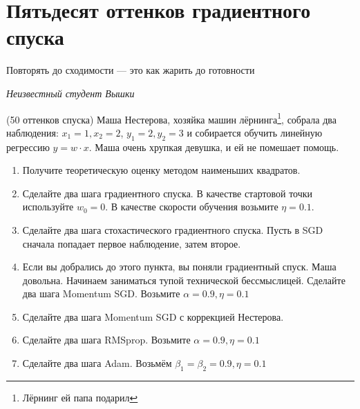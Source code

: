 
\section{Пятьдесят оттенков градиентного спуска}

\epigraph{Повторять до сходимости --- это как жарить до готовности}{\textit{Неизвестный студент Вышки}}



\begin{problem}{(50 оттенков спуска)}
	Маша Нестерова, хозяйка машин лёрнинга\footnote{Лёрнинг ей папа подарил},  собрала два наблюдения: $x_1 = 1, x_2 = 2$, $y_1 = 2, y_2 = 3$ и собирается обучить линейную регрессию $y = w \cdot x$.  Маша очень хрупкая девушка, и ей не помешает помощь. 

	\begin{enumerate}
		\item Получите теоретическую оценку методом наименьших квадратов.
		
		\item  Сделайте два шага градиентного спуска. В качестве стартовой точки используйте $w_0 = 0$.  В качестве скорости обучения возьмите $\eta = 0.1$. 
		
		\item Сделайте два шага стохастического градиентного спуска.  Пусть в SGD сначала попадает первое наблюдение, затем второе. 
		
		\item Если вы добрались до этого пункта, вы поняли градиентный спуск. Маша довольна. Начинаем заниматься тупой технической бессмыслицей. Сделайте два шага Momentum SGD. Возьмите $\alpha = 0.9, \eta = 0.1$
		
		\item  Сделайте два шага Momentum SGD с коррекцией Нестерова. 
		
		\item Сделайте два шага RMSprop.  Возьмите $\alpha = 0.9, \eta = 0.1$
		
		\item  Сделайте два шага Adam. Возьмём  $\beta_1 = \beta_2 = 0.9, \eta = 0.1$		
	\end{enumerate}
\end{problem}



